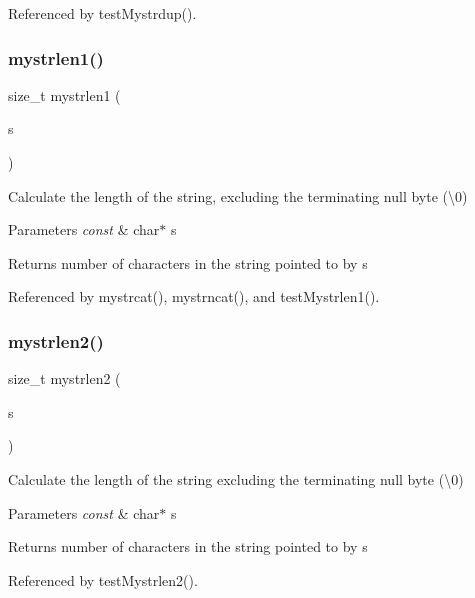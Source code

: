 Referenced by test\+Mystrdup().

\mbox{\label{mystring_8h_a71f9f1095f41990d202157923cfe578a}} 
\subsubsection{mystrlen1()}
{\footnotesize\ttfamily size\+\_\+t mystrlen1 (\begin{DoxyParamCaption}\item[{const char $\ast$}]{s }\end{DoxyParamCaption})}

Calculate the length of the string, excluding the terminating null byte (\textquotesingle{}\textbackslash{}0\textquotesingle{}) 
\begin{DoxyParams}{Parameters}
{\em const} & char$\ast$ s \\
\hline
\end{DoxyParams}
\begin{DoxyReturn}{Returns}
number of characters in the string pointed to by s 
\end{DoxyReturn}


Referenced by mystrcat(), mystrncat(), and test\+Mystrlen1().

\mbox{\label{mystring_8h_a0553e98c4213b02262ce36a73cc9b088}} 
\subsubsection{mystrlen2()}
{\footnotesize\ttfamily size\+\_\+t mystrlen2 (\begin{DoxyParamCaption}\item[{const char $\ast$}]{s }\end{DoxyParamCaption})}

Calculate the length of the string excluding the terminating null byte (\textquotesingle{}\textbackslash{}0\textquotesingle{}) 
\begin{DoxyParams}{Parameters}
{\em const} & char$\ast$ s \\
\hline
\end{DoxyParams}
\begin{DoxyReturn}{Returns}
number of characters in the string pointed to by s 
\end{DoxyReturn}


Referenced by test\+Mystrlen2().

